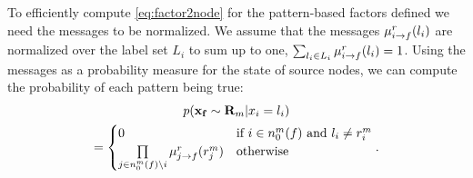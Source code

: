 \documentclass[letterpaper, 10 pt, conference]{ieeeconf} %
\newcommand{\vect}[1]{\mathbf{#1}}
\begin{document}
To efficiently compute \eqref{eq:factor2node} for the pattern-based factors
defined %
we need the messages to be
normalized. We assume that the messages $\bpmsg{i}{f}{l_i}{r}$ are normalized
over the label set $L_i$ to sum up to one, $ \sum_{l_i \in L_i}
\bpmsg{i}{f}{l_i}{r} = 1$.
Using the messages as a probability measure for the state of source nodes, 
we can compute the probability of each pattern being true:
\begin{multline}
  p(\vect{x_f} \sim \vect{R}_m|x_i = l_i) \\
  = \begin{cases}
0 & \text{if $i \in n^m_0(f)$ and $l_i \ne r^m_i$}\\
  \prod\limits_{j \in n^m_0(f) \setminus i}\bpmsg{j}{f}{r^m_j}{r} & \text{otherwise}
  \end{cases}
  .
\end{multline}
\end{document}
